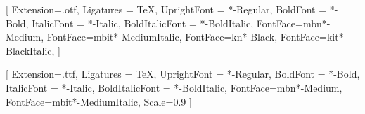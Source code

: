 \usepackage{fontspec}

[
	Extension=.otf,
	Ligatures = TeX,
	UprightFont = *-Regular,
	BoldFont = *-Bold,
	ItalicFont = *-Italic,
	BoldItalicFont = *-BoldItalic,
	FontFace={mb}{n}{*-Medium},
	FontFace={mb}{it}{*-MediumItalic},
	FontFace={k}{n}{*-Black},
	FontFace={k}{it}{*-BlackItalic},
]

[
	Extension=.ttf,
	Ligatures = TeX,
	UprightFont = *-Regular,
	BoldFont = *-Bold,
	ItalicFont = *-Italic,
	BoldItalicFont = *-BoldItalic,
	FontFace={mb}{n}{*-Medium},
	FontFace={mb}{it}{*-MediumItalic},
	Scale=0.9
]
